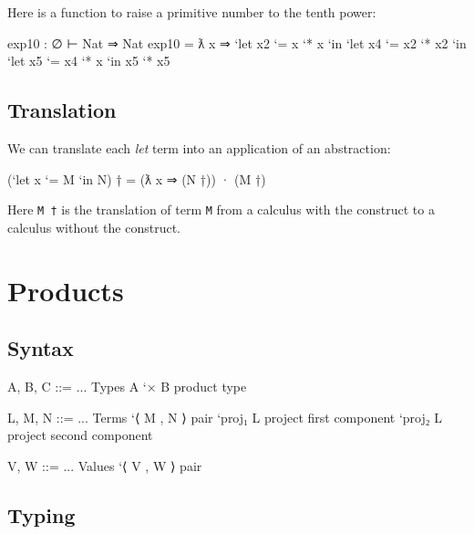 Here is a function to raise a primitive number to the tenth power:

\begin{myDisplay}
exp10 : ∅ ⊢ Nat ⇒ Nat
exp10 = ƛ x ⇒ `let x2  `= x  `* x  `in
              `let x4  `= x2 `* x2 `in
              `let x5  `= x4 `* x  `in
              x5 `* x5
\end{myDisplay}

\hypertarget{translation}{%
\subsection{Translation}\label{translation}}

We can translate each \emph{let} term into an application of an
abstraction:

\begin{myDisplay}
(`let x `= M `in N) †  =  (ƛ x ⇒ (N †)) · (M †)
\end{myDisplay}

Here \texttt{M\ †} is the translation of term \texttt{M} from a calculus
with the construct to a calculus without the construct.

\hypertarget{More-products}{%
\section{Products}\label{More-products}}

\hypertarget{syntax-2}{%
\subsection{Syntax}\label{syntax-2}}

\begin{myDisplay}
A, B, C ::= ...                     Types
  A `× B                              product type

L, M, N ::= ...                     Terms
  `⟨ M , N ⟩                          pair
  `proj₁ L                            project first component
  `proj₂ L                            project second component

V, W ::= ...                        Values
  `⟨ V , W ⟩                          pair
\end{myDisplay}

\hypertarget{typing-2}{%
\subsection{Typing}\label{typing-2}}

